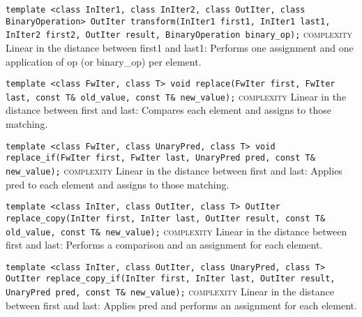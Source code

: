 \noindent{}\hspace*{0.25em}\lstinline[basicstyle=\ttfamily\color{corange}]{template <class InIter1, class InIter2, class OutIter, class BinaryOperation> OutIter transform(InIter1 first1, InIter1 last1, InIter2 first2, OutIter result, BinaryOperation binary_op);} \textsc{complexity} Linear in the distance between first1 and last1: Performs one assignment and one application of op (or binary\_op) per element.\\\vspace{-0.6em}

\noindent{}\hspace*{0.25em}\lstinline[basicstyle=\ttfamily\color{corange}]{template <class FwIter, class T> void replace(FwIter first, FwIter last, const T& old_value, const T& new_value);} \textsc{complexity} Linear in the distance between first and last: Compares each element and assigns to those matching.\\\vspace{-0.6em}

\noindent{}\hspace*{0.25em}\lstinline[basicstyle=\ttfamily\color{corange}]{template <class FwIter, class UnaryPred, class T> void replace_if(FwIter first, FwIter last, UnaryPred pred, const T& new_value);} \textsc{complexity} Linear in the distance between first and last: Applies pred to each element and assigns to those matching.\\\vspace{-0.6em}

\noindent{}\hspace*{0.25em}\lstinline[basicstyle=\ttfamily\color{corange}]{template <class InIter, class OutIter, class T> OutIter replace_copy(InIter first, InIter last, OutIter result, const T& old_value, const T& new_value);} \textsc{complexity} Linear in the distance between first and last: Performs a comparison and an assignment for each element.\\\vspace{-0.6em}

\noindent{}\hspace*{0.25em}\lstinline[basicstyle=\ttfamily\color{corange}]{template <class InIter, class OutIter, class UnaryPred, class T> OutIter replace_copy_if(InIter first, InIter last, OutIter result, UnaryPred pred, const T& new_value);} \textsc{complexity} Linear in the distance between first and last: Applies pred and performs an assignment for each element.\\\vspace{-0.6em}

